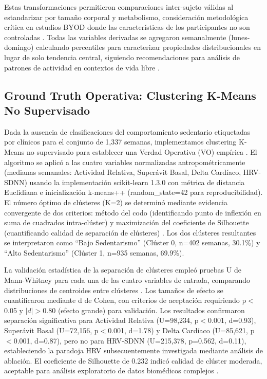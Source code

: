 \documentclass[journal,twoside,web]{ieeecolor}
\begin{document}
Estas transformaciones permitieron comparaciones inter-sujeto válidas al estandarizar por tamaño corporal y metabolismo, consideración metodológica crítica en estudios BYOD donde las características de los participantes no son controladas \cite{Guyon2003}. Todas las variables derivadas se agregaron semanalmente (lunes-domingo) calculando percentiles para caracterizar propiedades distribucionales en lugar de solo tendencia central, siguiendo recomendaciones para análisis de patrones de actividad en contextos de vida libre \cite{Dumuid2018}.

\subsection{Ground Truth Operativa: Clustering K-Means No Supervisado}
\label{subsec:clustering}

Dada la ausencia de clasificaciones del comportamiento sedentario etiquetadas por clínicos para el conjunto de 1,337 semanas, implementamos clustering K-Means no supervisado para establecer una Verdad Operativa (VO) empírica \cite{Jain2010}. El algoritmo se aplicó a las cuatro variables normalizadas antropométricamente (medianas semanales: Actividad Relativa, Superávit Basal, Delta Cardíaco, HRV-SDNN) usando la implementación scikit-learn 1.3.0 con métrica de distancia Euclidiana e inicialización k-means++ (random\_state=42 para reproducibilidad). El número óptimo de clústeres (K=2) se determinó mediante evidencia convergente de dos criterios: método del codo (identificando punto de inflexión en suma de cuadrados intra-clúster) y maximización del coeficiente de Silhouette (cuantificando calidad de separación de clústeres) \cite{Rousseeuw1987}. Los dos clústeres resultantes se interpretaron como ``Bajo Sedentarismo'' (Clúster 0, n=402 semanas, 30.1\%) y ``Alto Sedentarismo'' (Clúster 1, n=935 semanas, 69.9\%).

La validación estadística de la separación de clústeres empleó pruebas U de Mann-Whitney para cada una de las cuatro variables de entrada, comparando distribuciones de centroides entre clústeres \cite{Mann1947}. Los tamaños de efecto se cuantificaron mediante d de Cohen, con criterios de aceptación requiriendo p$<$0.05 y $|d| > 0.80$ (efecto grande) para validación. Los resultados confirmaron separación significativa para Actividad Relativa (U=98,234, p$<$0.001, d=0.93), Superávit Basal (U=72,156, p$<$0.001, d=1.78) y Delta Cardíaco (U=85,621, p$<$0.001, d=0.87), pero no para HRV-SDNN (U=215,378, p=0.562, d=0.11), estableciendo la paradoja HRV subsecuentemente investigada mediante análisis de ablación. El coeficiente de Silhouette de 0.232 indicó calidad de clúster moderada, aceptable para análisis exploratorio de datos biomédicos complejos \cite{Kaufman2005}.
\end{document}
